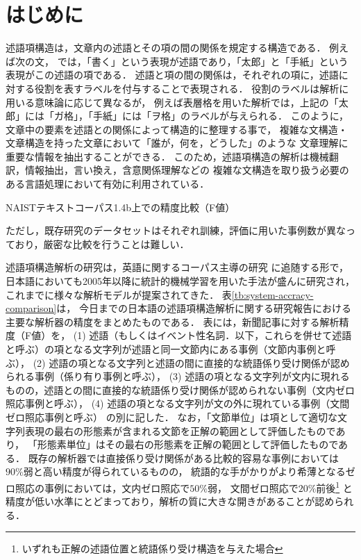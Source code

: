 \documentclass[japanese]{jnlp_1.4}
\begin{document}
\maketitle


\section{はじめに}

述語項構造は，文章内の述語とその項の間の関係を規定する構造である．
例えば次の文，
では，「書く」という表現が述語であり，「太郎」と「手紙」という表現がこの述語の項である．
述語と項の間の関係は，それぞれの項に，述語に対する役割を表すラベルを付与することで表現される．
役割のラベルは解析に用いる意味論に応じて異なるが，
例えば表層格を用いた解析では，上記の「太郎」には「ガ格」，「手紙」には「ヲ格」のラベルが与えられる．
このように，文章中の要素を述語との関係によって構造的に整理する事で，
複雑な文構造・文章構造を持った文章において「誰が，何を，どうした」のような
文章理解に重要な情報を抽出することができる．
このため，述語項構造の解析は機械翻訳，情報抽出，言い換え，含意関係理解などの
複雑な文構造を取り扱う必要のある言語処理において有効に利用されている\cite{shen2007using,liu2010semantic}．

\begin{table}[b]
\caption{NAISTテキストコーパス1.4b上での精度比較（F値）}
\label{tb:system-accracy-comparison}

\par\vspace{4pt}\small ただし，既存研究のデータセットはそれぞれ訓練，評価に用いた事例数が異なっており，厳密な比較を行うことは難しい．
\end{table}

述語項構造解析の研究は，英語に関するコーパス主導の研究
に追随する形で，日本語においても2005年以降に統計的機械学習を用いた手法が盛んに研究され，
これまでに様々な解析モデルが提案されてきた．
表\ref{tb:system-accracy-comparison}は，
今日までの日本語の述語項構造解析に関する研究報告における主要な解析器の精度をまとめたものである．
表には，新聞記事に対する解析精度（F値）を，
(1) 述語（もしくはイベント性名詞．以下，これらを併せて述語と呼ぶ）の項となる文字列が述語と同一文節内にある事例（文節内事例と呼ぶ），
(2) 述語の項となる文字列と述語の間に直接的な統語係り受け関係が認められる事例（係り有り事例と呼ぶ），
(3) 述語の項となる文字列が文内に現れるものの，述語との間に直接的な統語係り受け関係が認められない事例（文内ゼロ照応事例と呼ぶ），
(4) 述語の項となる文字列が文の外に現れている事例（文間ゼロ照応事例と呼ぶ）
の別に記した．
なお，「文節単位」は項として適切な文字列表現の最右の形態素が含まれる文節を正解の範囲として評価したものであり，
「形態素単位」はその最右の形態素を正解の範囲として評価したものである．
既存の解析器では直接係り受け関係がある比較的容易な事例においては$90\%$弱と高い精度が得られているものの，
統語的な手がかりがより希薄となるゼロ照応の事例においては，文内ゼロ照応で$50\%$弱，
文間ゼロ照応で$20\%$前後\footnote{いずれも正解の述語位置と統語係り受け構造を与えた場合}
と精度が低い水準にとどまっており，解析の質に大きな開きがあることが認められる．
\end{document}

